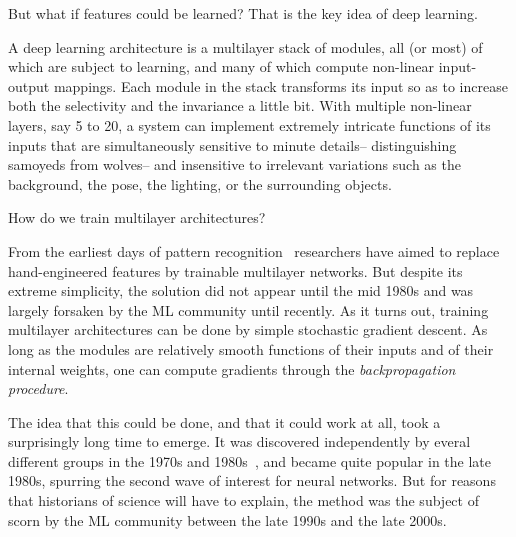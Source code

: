 \documentclass[10pts]{article}
\begin{document}
But what if features could be learned? That is the key idea of deep
learning.

A deep learning architecture is a multilayer stack of modules, all (or
most) of which are subject to learning, and many of which compute
non-linear input-output mappings.  Each module in the stack transforms
its input so as to increase both the selectivity and the invariance a
little bit.  With multiple non-linear layers, say 5 to 20, a system
can implement extremely intricate functions of its inputs that are
simultaneously sensitive to minute details-- distinguishing samoyeds
from wolves-- and insensitive to irrelevant variations such as the
background, the pose, the lighting, or the surrounding objects.

How do we train multilayer architectures? 

From the earliest days of pattern
recognition~\citep{selfridge,Rosenblatt57} researchers have aimed to
replace hand-engineered features by trainable multilayer networks.
But despite its extreme simplicity, the solution did not appear until
the mid 1980s and was largely forsaken by the ML community until
recently. As it turns out, training multilayer architectures can be
done by simple stochastic gradient descent. As long as the modules are
relatively smooth functions of their inputs and of their internal
weights, one can compute gradients through the {\em backpropagation
  procedure}.

The idea that this could be done, and that it could work at all, took
a surprisingly long time to emerge. It was discovered independently by
everal different groups in the 1970s and
1980s~\citep{Werbos74,Parker85,LeCun85,RHW}, and became quite popular
in the late 1980s, spurring the second wave of interest for neural
networks. But for reasons that historians of science will have to
explain, the method was the subject of scorn by the ML community
between the late 1990s and the late 2000s.
\end{document}

